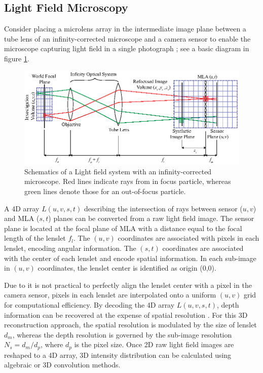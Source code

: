 \documentclass[draftthesis,fullpage]{uiucthesis}
\begin{document}
\subsection*{Light Field Microscopy}
Consider placing a microlens array in the intermediate image plane between a tube lens of an infinity-corrected microscope and a camera sensor to enable the microscope capturing light field in a single photograph \citep{levoy2006light}; see a basic diagram in figure \ref{fig:lf_principle}.

\begin{figure}[h]
       \centerline{\includegraphics[width=1\linewidth]{fig/LFM.eps}}
         \caption{Schematics of a Light field system with an infinity-corrected microscope. Red lines indicate rays from in focus particle, whereas green lines denote those for an out-of-focus particle.}
       \label{fig:lf_principle}
\end{figure}

A 4D array $L(u,v,s,t) $ \citep{levoy1996light} describing the intersection of rays between sensor ($u,v$) and MLA ($s,t$) planes can be converted from a raw light field image.  The sensor plane is located at the focal plane of MLA with a distance equal to the focal length of the lenslet $f_l$. The $(u,v)$ coordinates are associated with pixels in each lenslet, encoding angular information. The $(s,t)$ coordinates are associated with the center of each lenslet and encode spatial information. In each sub-image in $(u,v)$ coordinates, the lenslet center is identified as origin (0,0).

Due to it is not practical to perfectly align the lenslet center with a pixel in the camera sensor, pixels in each lenslet are interpolated onto a uniform $(u,v)$ grid for computational efficiency. By decoding the 4D array $L(u,v,s,t)$, depth information can be recovered at the expense of spatial resolution \citep{levoy2006light}. For this 3D reconstruction approach, the spatial resolution is modulated by the size of lenslet $d_m$, whereas the depth resolution is governed by the sub-image resolution $N_s = d_m / d_p$, where $d_p$ is the pixel size.  Once 2D raw light field images are reshaped to a 4D array, 3D intensity distribution can be calculated using algebraic or 3D convolution methods. 
\end{document}
